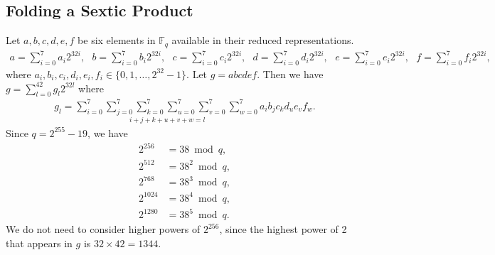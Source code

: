 \documentclass[a4paper, 12pt]{article}
\begin{document}
\subsection{Folding a Sextic Product}%
\label{subsec:folding_a_sextic_product}
Let $a,b,c,d,e,f$ be six elements in $\mathbb{F}_q$ available in their reduced representations.
\begin{align*}
  a = \sum^{7}_{i=0} a_i 2^{32i}, \ \ \ b = \sum^{7}_{i=0} b_i 2^{32i},\ \ \ 
  c = \sum^{7}_{i=0} c_i 2^{32i}, \ \ \ d = \sum^{7}_{i=0} d_i 2^{32i},\ \ \ 
  e = \sum^{7}_{i=0} e_i 2^{32i}, \ \ \ f = \sum^{7}_{i=0} f_i 2^{32i},
\end{align*}
where $a_i, b_i, c_i, d_i, e_i, f_i \in \{0,1,\ldots,2^{32}-1\}$.
Let $g = abcdef$. Then we have $g = \sum_{l=0}^{42} g_l 2^{32l}$ where
\begin{align*}
  g_l = \underset{i+j+k+u+v+w=l}{\sum_{i=0}^7 \sum_{j=0}^7 \sum_{k=0}^7 \sum_{u=0}^7 \sum_{v=0}^7 \sum_{w=0}^7} a_i b_j c_k d_u e_v f_w.
\end{align*}
Since $q = 2^{255}-19$, we have
\begin{align*}
  2^{256} & = 38 \bmod q,\\
  2^{512} & = 38^2 \bmod q,\\
  2^{768} & = 38^3 \bmod q,\\
  2^{1024} & = 38^4 \bmod q,\\
  2^{1280} & = 38^5 \bmod q.
\end{align*}
We do not need to consider higher powers of $2^{256}$, since the highest power of 2 that appears in $g$ is $32 \times 42 = 1344$.
\end{document}
